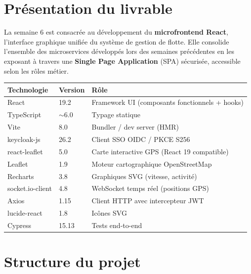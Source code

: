\documentclass[12pt,a4paper]{report}
\begin{document}
\section{Présentation du livrable}

La semaine 6 est consacrée au développement du \textbf{microfrontend React}, l'interface
graphique unifiée du système de gestion de flotte. Elle consolide l'ensemble des microservices
développés lors des semaines précédentes en les exposant à travers une \textbf{Single Page Application}
(SPA) sécurisée, accessible selon les rôles métier.

\begin{center}
\begin{tabular}{|l|l|l|}
  \hline
  \rowcolor{lightblue}
  \textbf{Technologie} & \textbf{Version} & \textbf{Rôle} \\
  \hline
  React           & 19.2   & Framework UI (composants fonctionnels + hooks) \\
  TypeScript      & $\sim$6.0 & Typage statique \\
  Vite            & 8.0    & Bundler / dev server (HMR) \\
  keycloak-js     & 26.2   & Client SSO OIDC / PKCE S256 \\
  react-leaflet   & 5.0    & Carte interactive GPS (React 19 compatible) \\
  Leaflet         & 1.9    & Moteur cartographique OpenStreetMap \\
  Recharts        & 3.8    & Graphiques SVG (vitesse, activité) \\
  socket.io-client & 4.8   & WebSocket temps réel (positions GPS) \\
  Axios           & 1.15   & Client HTTP avec intercepteur JWT \\
  lucide-react    & 1.8    & Icônes SVG \\
  Cypress         & 15.13  & Tests end-to-end \\
  \hline
\end{tabular}
\end{center}

\section{Structure du projet}
\end{document}
